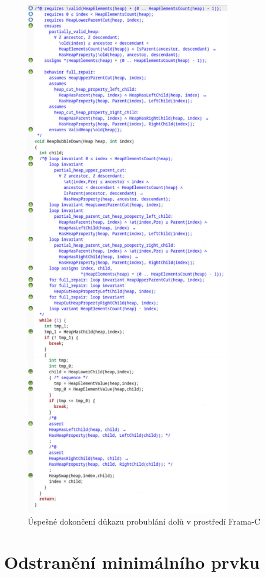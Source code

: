 \begin{figure}[H]
	\centering
	\includegraphics[width=9cm]{images/frama-c-HeapBubbleDown}
	\caption{Úspešné dokončení důkazu probublání dolů v prostředí Frama-C}
	\label{img:F-C-HeapBubbleDown}
\end{figure}

\section{Odstranění minimálního prvku}
\label{subsec:HeapExtractMin}

